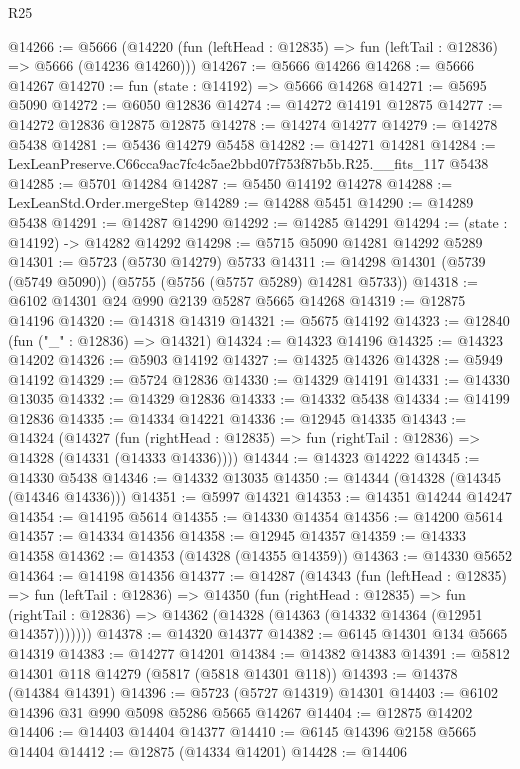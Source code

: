 \begin{lexlean}{R25}
\begin{coremodule}
@14266 := @5666
    (@14220 (fun (leftHead : @12835) => fun (leftTail : @12836) => @5666 (@14236 @14260)))
@14267 := @5666 @14266
@14268 := @5666 @14267
@14270 := fun (state : @14192) => @5666 @14268
@14271 := @5695 @5090
@14272 := @6050 @12836
@14274 := @14272 @14191 @12875
@14277 := @14272 @12836 @12875 @12875
@14278 := @14274 @14277
@14279 := @14278 @5438
@14281 := @5436 @14279 @5458
@14282 := @14271 @14281
@14284 := LexLeanPreserve.C66cca9ac7fc4c5ae2bbd07f753f87b5b.R25.__fits_117 @5438
@14285 := @5701 @14284
@14287 := @5450 @14192 @14278
@14288 := LexLeanStd.Order.mergeStep
@14289 := @14288 @5451
@14290 := @14289 @5438
@14291 := @14287 @14290
@14292 := @14285 @14291
@14294 := (state : @14192) -> @14282 @14292
@14298 := @5715 @5090 @14281 @14292 @5289
@14301 := @5723 (@5730 @14279) @5733
@14311 := @14298 @14301 (@5739 (@5749 @5090)) (@5755 (@5756 (@5757 @5289) @14281 @5733))
@14318 := @6102 @14301 @24 @990 @2139 @5287 @5665 @14268
@14319 := @12875 @14196
@14320 := @14318 @14319
@14321 := @5675 @14192
@14323 := @12840 (fun ("_" : @12836) => @14321)
@14324 := @14323 @14196
@14325 := @14323 @14202
@14326 := @5903 @14192
@14327 := @14325 @14326
@14328 := @5949 @14192
@14329 := @5724 @12836
@14330 := @14329 @14191
@14331 := @14330 @13035
@14332 := @14329 @12836
@14333 := @14332 @5438
@14334 := @14199 @12836
@14335 := @14334 @14221
@14336 := @12945 @14335
@14343 := @14324
    (@14327
      (fun (rightHead : @12835) => fun (rightTail : @12836) => @14328 (@14331 (@14333 @14336))))
@14344 := @14323 @14222
@14345 := @14330 @5438
@14346 := @14332 @13035
@14350 := @14344 (@14328 (@14345 (@14346 @14336)))
@14351 := @5997 @14321
@14353 := @14351 @14244 @14247
@14354 := @14195 @5614
@14355 := @14330 @14354
@14356 := @14200 @5614
@14357 := @14334 @14356
@14358 := @12945 @14357
@14359 := @14333 @14358
@14362 := @14353 (@14328 (@14355 @14359))
@14363 := @14330 @5652
@14364 := @14198 @14356
@14377 := @14287
    (@14343
      (fun (leftHead : @12835) =>
      fun (leftTail : @12836) =>
      @14350
        (fun (rightHead : @12835) =>
        fun (rightTail : @12836) => @14362 (@14328 (@14363 (@14332 @14364 (@12951 @14357)))))))
@14378 := @14320 @14377
@14382 := @6145 @14301 @134 @5665 @14319
@14383 := @14277 @14201
@14384 := @14382 @14383
@14391 := @5812 @14301 @118 @14279 (@5817 (@5818 @14301 @118))
@14393 := @14378 (@14384 @14391)
@14396 := @5723 (@5727 @14319) @14301
@14403 := @6102 @14396 @31 @990 @5098 @5286 @5665 @14267
@14404 := @12875 @14202
@14406 := @14403 @14404 @14377
@14410 := @6145 @14396 @2158 @5665 @14404
@14412 := @12875 (@14334 @14201)
@14428 := @14406

\end{coremodule}
\end{lexlean}
